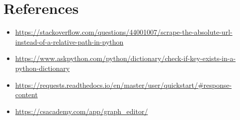 \documentclass[12pt]{article}
\begin{document}
\section*{References}


\begin{itemize}
    \item { \url{https://stackoverflow.com/questions/44001007/scrape-the-absolute-url-instead-of-a-relative-path-in-python}}
    \item {\url{https://www.askpython.com/python/dictionary/check-if-key-exists-in-a-python-dictionary}}
    \item {\url{https://requests.readthedocs.io/en/master/user/quickstart/#response-content}}
    \item { \url{https://csacademy.com/app/graph_editor/}}
\end{itemize}
\end{document}
